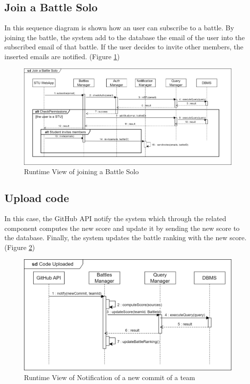 \subsection{Join a Battle Solo}
In this sequence diagram is shown how an user can subscribe to a battle. By joining the battle, the system add to the database the email of the user into the subscribed email of that battle. If the user decides to invite other members, the inserted emails are notified. (Figure \ref{fig:RuntimeView_JoinBattleSolo})
\begin{figure}[H]
    \centering
    \includegraphics[width=\textwidth]{images/runtimeviews/RuntimeView_JoinBattleSolo.png}
    \caption{Runtime View of joining a Battle Solo}
    \label{fig:RuntimeView_JoinBattleSolo}
\end{figure}

\subsection{Upload code}
In this case, the GitHub API notify the system which through the related component computes the new score and update it by sending the new score to the database. Finally, the system updates the battle ranking with the new score. (Figure \ref{fig:RuntimeView_CodeUploaded})
\begin{figure}[H]
    \centering
    \includegraphics[width=\textwidth]{images/runtimeviews/RuntimeView_CodeUploaded.png}
    \caption{Runtime View of Notification of a new commit of a team}
    \label{fig:RuntimeView_CodeUploaded}
\end{figure}

